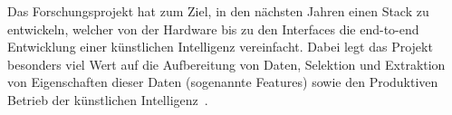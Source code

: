 Das Forschungsprojekt hat zum Ziel, in den nächsten Jahren einen Stack zu entwickeln, welcher von der Hardware bis zu den Interfaces die end-to-end Entwicklung einer künstlichen Intelligenz vereinfacht. Dabei legt das Projekt besonders viel Wert auf die Aufbereitung von Daten, Selektion und Extraktion von Eigenschaften dieser Daten (sogenannte Features) sowie den Produktiven Betrieb der künstlichen Intelligenz~\autocite{DAWN}.
